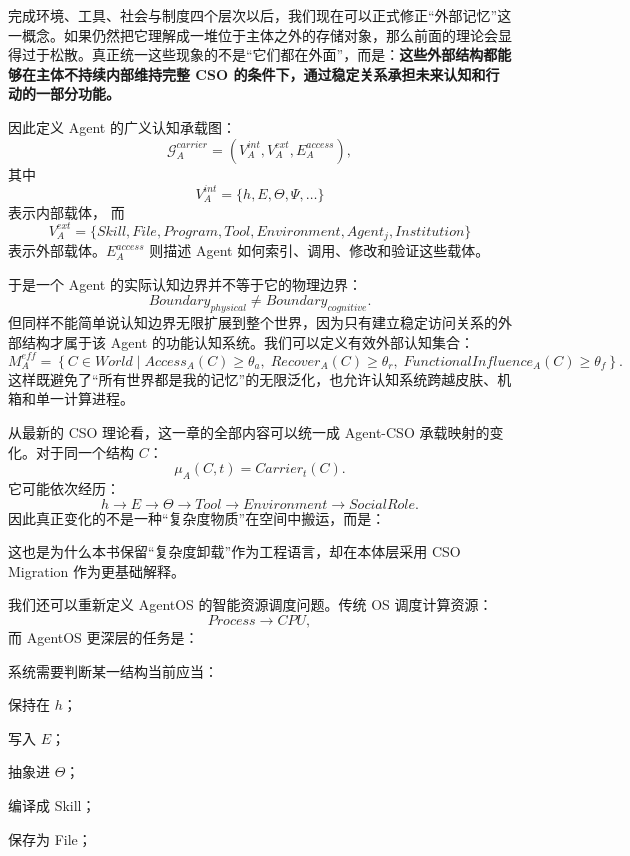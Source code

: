 完成环境、工具、社会与制度四个层次以后，我们现在可以正式修正``外部记忆''这一概念。如果仍然把它理解成一堆位于主体之外的存储对象，那么前面的理论会显得过于松散。真正统一这些现象的不是``它们都在外面''，而是：\textbf{这些外部结构都能够在主体不持续内部维持完整 CSO 的条件下，通过稳定关系承担未来认知和行动的一部分功能。}

因此定义 Agent 的广义认知承载图：
\[
\mathcal G_A^{carrier}
=
(
V_A^{int},
V_A^{ext},
E_A^{access}
),
\]
其中
\[
V_A^{int}
=
\{h,E,\Theta,\Psi,\ldots\}
\]
表示内部载体，
而
\[
V_A^{ext}
=
\{
Skill,
File,
Program,
Tool,
Environment,
Agent_j,
Institution
\}
\]
表示外部载体。$E_A^{access}$ 则描述 Agent 如何索引、调用、修改和验证这些载体。

于是一个 Agent 的实际认知边界并不等于它的物理边界：
\[
Boundary_{physical}
\neq
Boundary_{cognitive}.
\]
但同样不能简单说认知边界无限扩展到整个世界，因为只有建立稳定访问关系的外部结构才属于该 Agent 的功能认知系统。我们可以定义有效外部认知集合：
\[
M_A^{eff}
=
\left\{
C\in World
\mid
Access_A(C)\geq\theta_a,\;
Recover_A(C)\geq\theta_r,\;
FunctionalInfluence_A(C)\geq\theta_f
\right\}.
\]
这样既避免了``所有世界都是我的记忆''的无限泛化，也允许认知系统跨越皮肤、机箱和单一计算进程。

从最新的 CSO 理论看，这一章的全部内容可以统一成 Agent-CSO 承载映射的变化。对于同一个结构 $C$：
\[
\mu_A(C,t)
=
Carrier_t(C).
\]
它可能依次经历：
\[
h
\rightarrow
E
\rightarrow
\Theta
\rightarrow
Tool
\rightarrow
Environment
\rightarrow
SocialRole.
\]
因此真正变化的不是一种``复杂度物质''在空间中搬运，而是：
\begin{statementbox}
\centering
{}
\end{statementbox}
这也是为什么本书保留``复杂度卸载''作为工程语言，却在本体层采用 CSO Migration 作为更基础解释。

我们还可以重新定义 AgentOS 的智能资源调度问题。传统 OS 调度计算资源：
\[
Process\rightarrow CPU,
\]
而 AgentOS 更深层的任务是：
\begin{statementbox}
\centering
{}
\end{statementbox}
系统需要判断某一结构当前应当：

保持在 $h$；

写入 $E$；

抽象进 $\Theta$；

编译成 Skill；

保存为 File；


